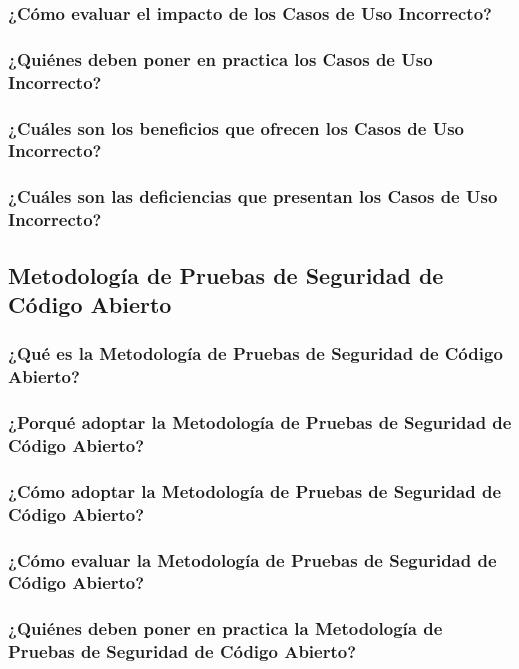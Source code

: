 \documentclass[runningheads,a4paper]{llncs}
\begin{document}
\subsubsection{¿Cómo evaluar el impacto de los Casos de Uso Incorrecto?}

\subsubsection{¿Quiénes deben poner en practica los Casos de Uso Incorrecto?}

\subsubsection{¿Cuáles son los beneficios que ofrecen los Casos de Uso Incorrecto?}

\subsubsection{¿Cuáles son las deficiencias que presentan los Casos de Uso Incorrecto?}


\subsection{Metodología de Pruebas de Seguridad de Código Abierto}

\subsubsection{¿Qué es la Metodología de Pruebas de Seguridad de Código Abierto?}

\subsubsection{¿Porqué adoptar la Metodología de Pruebas de Seguridad de Código Abierto?}

\subsubsection{¿Cómo adoptar la Metodología de Pruebas de Seguridad de Código Abierto?}

\subsubsection{¿Cómo evaluar la Metodología de Pruebas de Seguridad de Código Abierto?}

\subsubsection{¿Quiénes deben poner en practica la Metodología de Pruebas de Seguridad de Código Abierto?}
\end{document}

